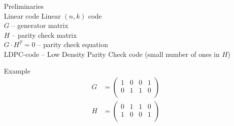 \documentclass[t,13pt,graphics=pdflatex,xcolor=table,aspectratio=43]{beamer}
\begin{document}
\begin{frame}{Preliminaries \\ Linear code}
  Linear $(n,k)$ code \\
  $G$ -- generator matrix \\
  $H$ -- parity check matrix \\
  $G \cdot H^T = 0$ -- parity check equation \\
 LDPC-code -- Low Density Parity Check code (small number of ones in $H$) \\ 

\begin{exampleblock}{Example}
\begin{align*}
    G&=
    \begin{pmatrix}
        1&0&0&   1\\
        0&1&1& 0\\
    \end{pmatrix} \text{  } \\
    H&=
    \begin{pmatrix}
        0&1&1&0 \\
        1&0&0&1 \\
    \end{pmatrix} \text{  } 
\end{align*}
\end{exampleblock}
\end{frame}

{
\begin{frame}[plain]
\end{frame}
}
\end{document}
